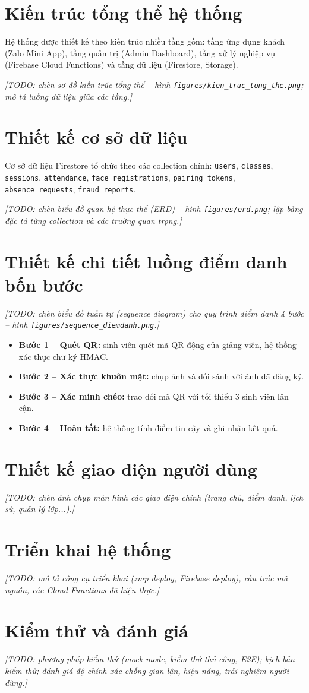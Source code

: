 \documentclass[../main.tex]{subfiles}
\begin{document}
\section{Kiến trúc tổng thể hệ thống}
Hệ thống được thiết kế theo kiến trúc nhiều tầng gồm: tầng ứng dụng khách (Zalo Mini App), tầng quản trị (Admin Dashboard), tầng xử lý nghiệp vụ (Firebase Cloud Functions) và tầng dữ liệu (Firestore, Storage).

\textit{[TODO: chèn sơ đồ kiến trúc tổng thể -- hình \texttt{figures/kien\_truc\_tong\_the.png}; mô tả luồng dữ liệu giữa các tầng.]}

\section{Thiết kế cơ sở dữ liệu}
Cơ sở dữ liệu Firestore tổ chức theo các collection chính: \texttt{users}, \texttt{classes}, \texttt{sessions}, \texttt{attendance}, \texttt{face\_registrations}, \texttt{pairing\_tokens}, \texttt{absence\_requests}, \texttt{fraud\_reports}.

\textit{[TODO: chèn biểu đồ quan hệ thực thể (ERD) -- hình \texttt{figures/erd.png}; lập bảng đặc tả từng collection và các trường quan trọng.]}

\section{Thiết kế chi tiết luồng điểm danh bốn bước}
\textit{[TODO: chèn biểu đồ tuần tự (sequence diagram) cho quy trình điểm danh 4 bước -- hình \texttt{figures/sequence\_diemdanh.png}.]}
\begin{itemize}
    \item \textbf{Bước 1 -- Quét QR:} sinh viên quét mã QR động của giảng viên, hệ thống xác thực chữ ký HMAC.
    \item \textbf{Bước 2 -- Xác thực khuôn mặt:} chụp ảnh và đối sánh với ảnh đã đăng ký.
    \item \textbf{Bước 3 -- Xác minh chéo:} trao đổi mã QR với tối thiểu 3 sinh viên lân cận.
    \item \textbf{Bước 4 -- Hoàn tất:} hệ thống tính điểm tin cậy và ghi nhận kết quả.
\end{itemize}

\section{Thiết kế giao diện người dùng}
\textit{[TODO: chèn ảnh chụp màn hình các giao diện chính (trang chủ, điểm danh, lịch sử, quản lý lớp...).]}

\section{Triển khai hệ thống}
\textit{[TODO: mô tả công cụ triển khai (zmp deploy, Firebase deploy), cấu trúc mã nguồn, các Cloud Functions đã hiện thực.]}

\section{Kiểm thử và đánh giá}
\textit{[TODO: phương pháp kiểm thử (mock mode, kiểm thử thủ công, E2E); kịch bản kiểm thử; đánh giá độ chính xác chống gian lận, hiệu năng, trải nghiệm người dùng.]}
\end{document}
